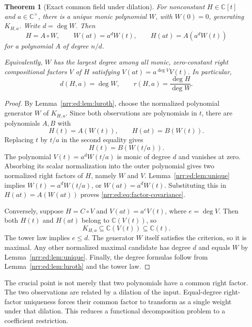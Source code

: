 \documentclass[11pt,letterpaper]{article}
\newtheorem{theorem}{Theorem}[section]
\theoremstyle{definition}
\theoremstyle{remark}
\newcommand{\C}{\mathbb C}
\newcommand{\field}{K_{H,a}}
\begin{document}
\begin{theorem}[Exact common field under dilation]
\label{nrr:ed:thm:common}
For nonconstant $H\in\C[t]$ and $a\in\C^\times$, there is a unique monic
polynomial $W$, with $W(0)=0$, generating $\field$. Write $d=\deg W$. Then
\begin{equation}
 H=A\circ W,\qquad W(at)=a^dW(t),\qquad
 H(at)=A(a^dW(t))
 \label{nrr:ed:eq:factor-covariance}
\end{equation}
for a polynomial $A$ of degree $n/d$.

Equivalently, $W$ has the largest degree among all monic, zero-constant right
compositional factors $V$ of $H$ satisfying $V(at)=a^{\deg V}V(t)$. In particular,
\begin{equation}
 d(H,a)=\deg W,\qquad r(H,a)=\frac{\deg H}{\deg W}.
 \label{nrr:ed:eq:degree-theorem}
\end{equation}
\end{theorem}

\begin{proof}
By Lemma~\ref{nrr:ed:lem:luroth}, choose the normalized polynomial generator $W$ of
$\field$. Since both observations are polynomials in $t$, there are polynomials
$A,B$ with
\[
 H(t)=A(W(t)),\qquad H(at)=B(W(t)).
\]
Replacing $t$ by $t/a$ in the second equality gives
\[
 H(t)=B(W(t/a)).
\]
The polynomial $V(t)=a^dW(t/a)$ is monic of degree $d$ and vanishes at zero.
Absorbing its scalar normalization into the outer polynomial gives two normalized
right factors of $H$, namely $W$ and $V$. Lemma~\ref{nrr:ed:lem:unique} implies
$W(t)=a^dW(t/a)$, or $W(at)=a^dW(t)$. Substituting this in $H(at)=A(W(at))$
proves \eqref{nrr:ed:eq:factor-covariance}.

Conversely, suppose $H=C\circ V$ and $V(at)=a^eV(t)$, where $e=\deg V$.
Then both $H(t)$ and $H(at)$ belong to $\C(V(t))$, so
\[
 \field\subseteq\C(V(t))\subseteq\C(t).
\]
The tower law implies $e\le d$. The generator $W$ itself satisfies the criterion,
so it is maximal. Any other normalized maximal candidate has degree $d$ and equals
$W$ by Lemma~\ref{nrr:ed:lem:unique}. Finally, the degree formulas follow from
Lemma~\ref{nrr:ed:lem:luroth} and the tower law.
\end{proof}

The crucial point is not merely that two polynomials have a common right factor.
The two observations are related by a dilation of the input. Equal-degree
right-factor uniqueness forces their common factor to transform as a single
weight under that dilation. This reduces a functional decomposition problem to a
coefficient restriction.
\end{document}
